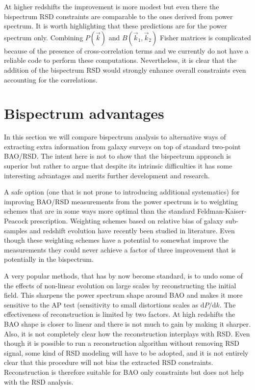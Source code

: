 At higher redshifts the improvement is more modest but even there the
bispectrum RSD constraints are comparable to the ones derived from power
spectrum. It is worth highlighting that these predictions are for the power
spectrum only. Combining $P(\vec{k})$ and $B(\vec{k}_1,\vec{k}_2)$ Fisher
matrices is complicated because of the presence of cross-correlation terms and
we currently do not have a reliable code to perform these computations.
Nevertheless, it is clear that the addition of the bispectrum RSD would
strongly enhance overall constraints even accounting for the correlations.

\section{Bispectrum advantages}

In this section we will compare bispectrum analysis to alternative ways of
extracting extra information from galaxy surveys on top of standard two-point
BAO/RSD. The intent here is not to show that the bispectrum approach is
superior but rather to argue that despite its intrinsic difficulties it has
some interesting advantages and merits further development and research.

A safe option (one that is not prone to introducing additional systematics) for
improving BAO/RSD measurements from the power spectrum is to weighting schemes
that are in some ways more optimal than the standard Feldman-Kaiser-Peacock
prescription. Weighting schemes based on relative bias of galaxy sub-samples and
redshift evolution have recently been studied in literature. Even though these
weighting schemes have a potential to somewhat improve the measurements they
could never achieve a factor of three improvement that is potentially in the
bispectrum.

A very popular methods, that has by now become standard, is to undo some of the
effects of non-linear evolution on large scales by reconstructing the initial
field. This sharpens the power spectrum shape around BAO and makes it more
sensitive to the AP test (sensitivity to small distortions scales as
$\mathrm{d}P/\mathrm{d}k$. The effectiveness of reconstruction is limited by
two factors. At high redshifts the BAO shape is closer to linear and there is
not much to gain by making it sharper. Also, it is not completely clear how the
reconstruction interplays with RSD. Even though it is possible to run a
reconstruction algorithm without removing RSD signal, some kind of RSD modeling
will have to be adopted, and it is not entirely clear that this procedure will
not bias the extracted RSD constraints. Reconstruction is therefore suitable
for BAO only constraints but does not help with the RSD analysis.

